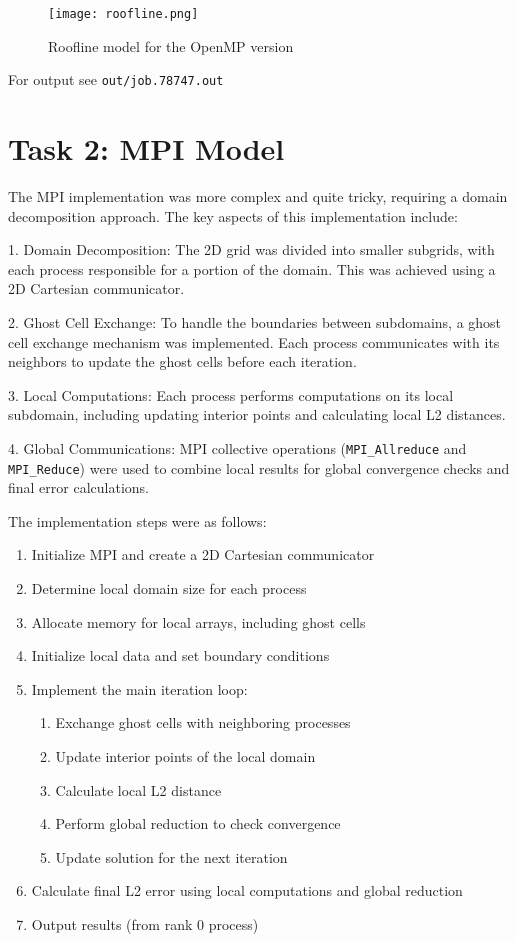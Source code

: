\documentclass{article}
\begin{document}
\begin{figure}[H]
    \centering
    \texttt{[image: roofline.png]}
    \caption{Roofline model for the OpenMP version}
    \label{fig:roofline_model}
\end{figure}
For output see \texttt{out/job.78747.out}
\section{Task 2: MPI Model}

The MPI implementation was more complex and quite tricky, requiring a domain decomposition approach. The key aspects of this implementation include:

1. Domain Decomposition: The 2D grid was divided into smaller subgrids, with each process responsible for a portion of the domain. This was achieved using a 2D Cartesian communicator.

2. Ghost Cell Exchange: To handle the boundaries between subdomains, a ghost cell exchange mechanism was implemented. Each process communicates with its neighbors to update the ghost cells before each iteration.

3. Local Computations: Each process performs computations on its local subdomain, including updating interior points and calculating local L2 distances.

4. Global Communications: MPI collective operations (\texttt{MPI\_Allreduce} and \texttt{MPI\_Reduce}) were used to combine local results for global convergence checks and final error calculations.

The implementation steps were as follows:

\begin{enumerate}
    \item Initialize MPI and create a 2D Cartesian communicator
    \item Determine local domain size for each process
    \item Allocate memory for local arrays, including ghost cells
    \item Initialize local data and set boundary conditions
    \item Implement the main iteration loop:
    \begin{enumerate}
        \item Exchange ghost cells with neighboring processes
        \item Update interior points of the local domain
        \item Calculate local L2 distance
        \item Perform global reduction to check convergence
        \item Update solution for the next iteration
    \end{enumerate}
    \item Calculate final L2 error using local computations and global reduction
    \item Output results (from rank 0 process)
\end{enumerate}
\end{document}
